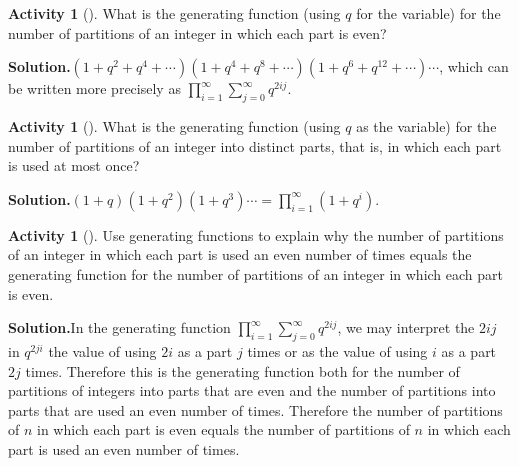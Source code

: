 \documentclass[10pt,]{book}
\theoremstyle{plain}
\theoremstyle{definition}
\newtheorem{activity}[project]{Activity}
\numberwithin{equation}{chapter}
\begin{document}
\begin{activity}[]\label{activity-178}
What is the generating function (using \(q\) for the variable) for the number of partitions of an integer in which each part is even?%
\par\medskip\noindent%
\textbf{Solution.}\quad \((1+q^2+q^4+\cdots)(1+q^4+q^8+\cdots)(1+q^6+q^{12}+\cdots)\cdots\), which can be written more precisely as \(\displaystyle\prod_{i=1}^\infty
\sum_{j=0}^\infty q^{2ij}\).%
\end{activity}
\begin{activity}[]\label{activity-179}
What is the generating function (using \(q\) as the variable) for the number of partitions of an integer into distinct parts, that is, in which each part is used at most once?%
\par\medskip\noindent%
\textbf{Solution.}\quad \(\displaystyle (1+q)(1+q^2)(1+q^3)\cdots=
\prod_{i=1}^\infty(1+q^i)\).%
\end{activity}
\begin{activity}[]\label{activity-180}
Use generating functions to explain why the number of partitions of an integer in which each part is used an even number of times equals the generating function for the number of partitions of an integer in which each part is even.%
\par\medskip\noindent%
\textbf{Solution.}\quad In the generating function \(\displaystyle\prod_{i=1}^\infty \sum_{j=0}^\infty q^{2ij}\), we may interpret the \(2ij\) in \(q^{2ji}\) the value of using \(2i\) as a part \(j\) times or as the value of using \(i\) as a part \(2j\) times. Therefore this is the generating function both for the number of partitions of integers into parts that are even and the number of partitions into parts that are used an even number of times. Therefore the number of partitions of \(n\) in which each part is even equals the number of partitions of \(n\) in which each part is used an even number of times.%
\end{activity}
\end{document}
